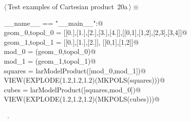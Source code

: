 \documentclass[11pt,oneside]{article}	%
\begin{document}
\begin{flushleft} \small
\begin{minipage}{\linewidth} \label{scrap31}
\protect{}$\langle\,$Test examples of Cartesian product\nobreak\ {\footnotesize 20a}$\,\rangle\equiv$
\vspace{-1ex}
\begin{list}{}{} \item
\mbox{}\verb@if __name__ == "__main__":@\\
\mbox{}\verb@    geom_0,topol_0 = [[0.],[1.],[2.],[3.],[4.]],[[0,1],[1,2],[2,3],[3,4]]@\\
\mbox{}\verb@    geom_1,topol_1 = [[0.],[1.],[2.]], [[0,1],[1,2]]@\\
\mbox{}\verb@    mod_0 = (geom_0,topol_0)@\\
\mbox{}\verb@    mod_1 = (geom_1,topol_1)@\\
\mbox{}\verb@    squares = larModelProduct([mod_0,mod_1])@\\
\mbox{}\verb@    VIEW(EXPLODE(1.2,1.2,1.2)(MKPOLS(squares)))@\\
\mbox{}\verb@    cubes = larModelProduct([squares,mod_0])@\\
\mbox{}\verb@    VIEW(EXPLODE(1.2,1.2,1.2)(MKPOLS(cubes)))@\\
\mbox{}\verb@@{\NWsep}
\end{list}
\vspace{-1ex}
\footnotesize\addtolength{\baselineskip}{-1ex}
\begin{list}{}{\setlength{\itemsep}{-\parsep}\setlength{\itemindent}{-\leftmargin}}
\item \NWtxtMacroRefIn\ .
\end{list}
\end{minipage}\\[4ex]
\end{flushleft}
\end{document}
